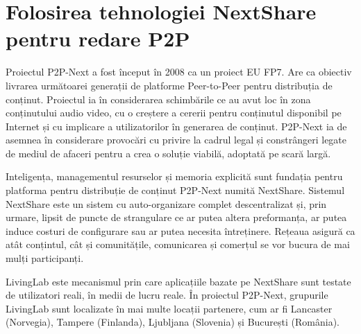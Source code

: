 \section{Folosirea tehnologiei NextShare pentru redare P2P}
\label{sec:multimedia-dist:nextshare}

Proiectul P2P-Next a fost început în 2008 ca un proiect EU FP7. Are ca obiectiv
livrarea următoarei generații de platforme Peer-to-Peer pentru distribuția de
conținut. Proiectul ia în considerarea schimbările ce au avut loc în zona
conținutului audio video, cu o creștere a cererii pentru conținutul disponibil
pe Internet și cu implicare a utilizatorilor în generarea de conținut.
P2P-Next ia de asemnea în considerare provocări cu privire la cadrul legal și
constrângeri legate de mediul de afaceri pentru a crea o soluție viabilă,
adoptată pe scară largă.

Inteligența, managementul resurselor și memoria explicită sunt fundația pentru
platforma pentru distribuție de conținut P2P-Next numită NextShare. Sistemul
NextShare este un sistem cu auto-organizare complet descentralizat și, prin
urmare, lipsit de puncte de strangulare ce ar putea altera preformanța, ar
putea induce costuri de configurare sau ar putea necesita întreținere.
Rețeaua asigură ca atât conțintul, cât și comunitățile, comunicarea și
comerțul se vor bucura de mai mulți participanți.

LivingLab este mecanismul prin care aplicațiile bazate pe NextShare sunt
testate de utilizatori reali, în medii de lucru reale. În proiectul P2P-Next,
grupurile LivingLab sunt localizate în mai multe locații partenere, cum ar fi
Lancaster (Norvegia), Tampere (Finlanda), Ljubljana (Slovenia) și București
(România).


